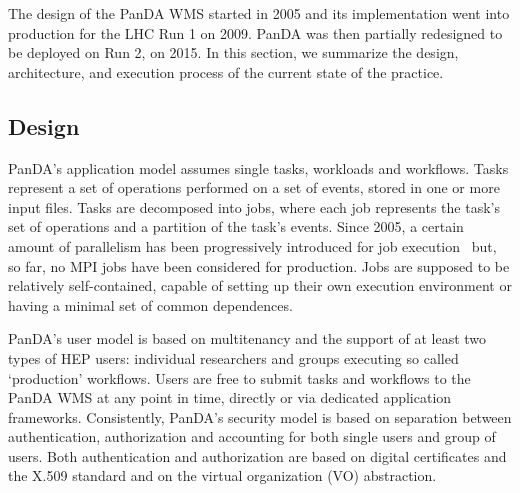 
The design of the PanDA WMS started in 2005 and its implementation went into
production for the LHC Run 1 on 2009. PanDA was then partially redesigned to be
deployed on Run 2, on 2015. In this section, we summarize the design,
architecture, and execution process of the current state of the practice.


\subsection{Design}
\label{ssec:panda_design}


PanDA's application model assumes single tasks, workloads and workflows. Tasks
represent a set of operations performed on a set of events, stored in one or
more input files. Tasks are decomposed into jobs, where each job represents the
task's set of operations and a partition of the task's events. Since 2005, a
certain amount of parallelism has been progressively introduced for job
execution~\cite{crooks2012multi} but, so far, no MPI jobs have been considered
for production. Jobs are supposed to be relatively self-contained, capable of
setting up their own execution environment or having a minimal set of common
dependences.


PanDA's user model is based on multitenancy and the support of at least two
types of HEP users: individual researchers and groups executing so called
`production' workflows. Users are free to submit tasks and workflows to the
PanDA WMS at any point in time, directly or via dedicated application
frameworks. Consistently, PanDA's security model is based on separation between
authentication, authorization and accounting for both single users and group of
users. Both authentication and authorization are based on digital certificates
and the X.509 standard and on the virtual organization (VO) abstraction.

